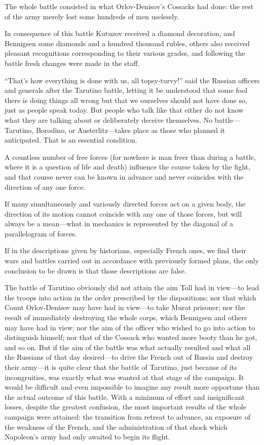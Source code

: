 The whole battle consisted in what Orlov-Denisov's Cossacks had
done: the rest of the army merely lost some hundreds of men
uselessly.

In consequence of this battle Kutuzov received a diamond
decoration, and Bennigsen some diamonds and a hundred thousand
rubles, others also received pleasant recognitions corresponding
to their various grades, and following the battle fresh changes
were made in the staff.

``That's how everything is done with us, all topsy-turvy!'' said
the Russian officers and generals after the Tarutino battle,
letting it be understood that some fool there is doing things all
wrong but that we ourselves should not have done so, just as
people speak today. But people who talk like that either do not
know what they are talking about or deliberately deceive
themselves. No battle---Tarutino, Borodino, or Austerlitz---takes
place as those who planned it anticipated. That is an essential
condition.

A countless number of free forces (for nowhere is man freer than
during a battle, where it is a question of life and death)
influence the course taken by the fight, and that course never
can be known in advance and never coincides with the direction of
any one force.

If many simultaneously and variously directed forces act on a
given body, the direction of its motion cannot coincide with any
one of those forces, but will always be a mean---what in
mechanics is represented by the diagonal of a parallelogram of
forces.

If in the descriptions given by historians, especially French
ones, we find their wars and battles carried out in accordance
with previously formed plans, the only conclusion to be drawn is
that those descriptions are false.

The battle of Tarutino obviously did not attain the aim Toll had
in view---to lead the troops into action in the order prescribed
by the dispositions; nor that which Count Orlov-Denisov may have
had in view---to take Murat prisoner; nor the result of
immediately destroying the whole corps, which Bennigsen and
others may have had in view; nor the aim of the officer who
wished to go into action to distinguish himself; nor that of the
Cossack who wanted more booty than he got, and so on.  But if the
aim of the battle was what actually resulted and what all the
Russians of that day desired---to drive the French out of Russia
and destroy their army---it is quite clear that the battle of
Tarutino, just because of its incongruities, was exactly what was
wanted at that stage of the campaign. It would be difficult and
even impossible to imagine any result more opportune than the
actual outcome of this battle. With a minimum of effort and
insignificant losses, despite the greatest confusion, the most
important results of the whole campaign were attained: the
transition from retreat to advance, an exposure of the weakness
of the French, and the administration of that shock which
Napoleon's army had only awaited to begin its flight.

